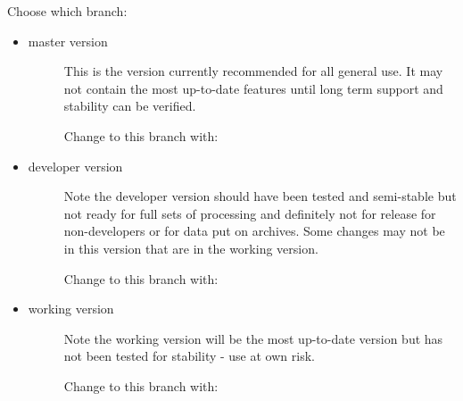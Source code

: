 \documentclass[a4paper,10pt,english]{report}
\begin{document}
Choose which branch:
\begin{itemize}
\item {} \begin{description}
\item[{master version}] \leavevmode
This is the version currently recommended for all general use.
It may not contain the most up-to-date features until long term support
and stability can be verified.

Change to this branch with:

\begin{sphinxVerbatim}[commandchars=\\\{\}]
   
    
\end{sphinxVerbatim}

\end{description}

\item {} \begin{description}
\item[{developer version}] \leavevmode
Note the developer version should have been tested and semi-stable but
not ready for full sets of processing and definitely not for release for
non-developers or for data put on archives. Some changes may not be
in this version that are in the working version.

Change to this branch with:

\begin{sphinxVerbatim}[commandchars=\\\{\}]
   
    
\end{sphinxVerbatim}

\end{description}

\item {} \begin{description}
\item[{working version}] \leavevmode
Note the working version will be the most up-to-date version but has not been
tested for stability - use at own risk.

Change to this branch with:

\begin{sphinxVerbatim}[commandchars=\\\{\}]
   
    
\end{sphinxVerbatim}

\end{description}

\end{itemize}
\end{document}
